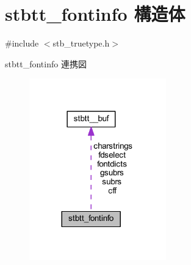 \hypertarget{structstbtt__fontinfo}{}\section{stbtt\+\_\+fontinfo 構造体}
\label{structstbtt__fontinfo}


{\ttfamily \#include $<$stb\+\_\+truetype.\+h$>$}



stbtt\+\_\+fontinfo 連携図\nopagebreak
\begin{figure}[H]
\begin{center}
\leavevmode
\includegraphics[width=168pt]{structstbtt__fontinfo__coll__graph}
\end{center}
\end{figure}
